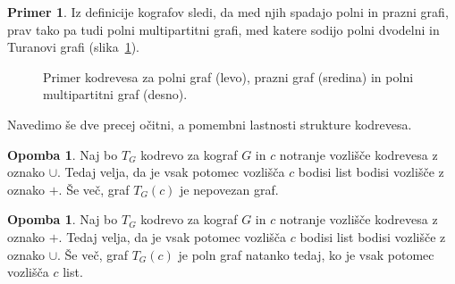 \documentclass[12pt,a4paper,twoside]{article}
\theoremstyle{definition} %
\newtheorem{primer}[definicija]{Primer}
\newtheorem{opomba}[definicija]{Opomba}
\theoremstyle{plain} %
\numberwithin{equation}{section}  %
\begin{document}
\begin{primer}
Iz definicije kografov sledi, da med njih spadajo polni in prazni grafi, prav tako pa tudi polni multipartitni grafi, med katere sodijo polni dvodelni in Turanovi grafi (slika~\ref{fig:primerKodrevesDruzineGrafov}).
\begin{figure}[h!]
\centering
{}
\hspace{20pt}
\hspace{20pt}
\caption{Primer kodrevesa za polni graf (levo), prazni graf (sredina) in polni multipartitni graf (desno).} \label{fig:primerKodrevesDruzineGrafov}
\end{figure}
\end{primer}

Navedimo še dve precej očitni, a pomembni lastnosti strukture kodrevesa.

\begin{opomba}\label{Observation 5}
Naj bo $T_G$ kodrevo za kograf $G$ in $c$ notranje vozlišče kodrevesa z oznako $\cup$. Tedaj velja, da je vsak potomec vozlišča $c$ bodisi list bodisi vozlišče z oznako $+$. Še več, graf $T_G(c)$ je nepovezan graf.
\end{opomba}
\begin{opomba}\label{Observation 6}
Naj bo $T_G$ kodrevo za kograf $G$ in $c$ notranje vozlišče kodrevesa z oznako $+$. Tedaj velja, da je vsak potomec vozlišča $c$ bodisi list bodisi vozlišče z oznako $\cup$. Še več, graf $T_G(c)$ je poln graf natanko tedaj, ko je vsak potomec vozlišča $c$ list.
\end{opomba}
\end{document}
